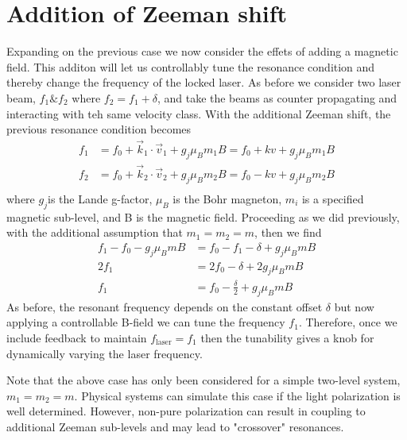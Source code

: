 \section{Addition of Zeeman shift}
Expanding on the previous case we now consider the effets of adding a magnetic field.
This additon will let us controllably tune the resonance condition and thereby change the frequency of the locked laser.
As before we consider two laser beam, $f_1 \& f_2$ where $f_2 = f_1 + \delta$, and take the beams as counter propagating and interacting with teh same velocity class.
With the additional Zeeman shift, the previous resonance condition becomes
\begin{equation}
\begin{split}
	f_1 &= f_0 +  \vec{k}_1 \cdot \vec{v}_1 + g_j \mu_B m_1 B = f_0 + k v + g_j \mu_B m_1 B \\
	f_2 &= f_0 +  \vec{k}_2 \cdot \vec{v}_2 + g_j \mu_B m_2 B = f_0 - k v + g_j \mu_B m_2 B \\
\end{split}
\end{equation}
where $g_j$is the Lande g-factor, $\mu_B$ is the Bohr magneton, $m_i$ is a specified magnetic sub-level, and B is the magnetic field.
Proceeding as we did previously, with the additional assumption that $m_1=m_2=m$, then we find
\begin{equation}
\begin{split}
	f_1 - f_0 - g_j \mu_B mB &= f_0 - f_1 - \delta + g_j \mu_B mB \\
		 2f_1 &= 2f_0 - \delta + 2 g_j \mu_B mB \\
  f_1  &=   f_0 - \frac{\delta}{2} + g_j \mu_B mB
\end{split}
\end{equation}
As before, the resonant frequency depends on the constant offset $\delta$ but now applying a controllable B-field we can tune the frequency $f_1$.
Therefore, once we include feedback to maintain $f_{\text{laser}}=f_1$ then the tunability gives a knob for dynamically varying the laser frequency.

Note that the above case has only been considered for a simple two-level system, $m_1=m_2=m$.
Physical systems can simulate this case if the light polarization is well determined.
However, non-pure polarization can result in coupling to additional Zeeman sub-levels and may lead to "crossover" resonances.
